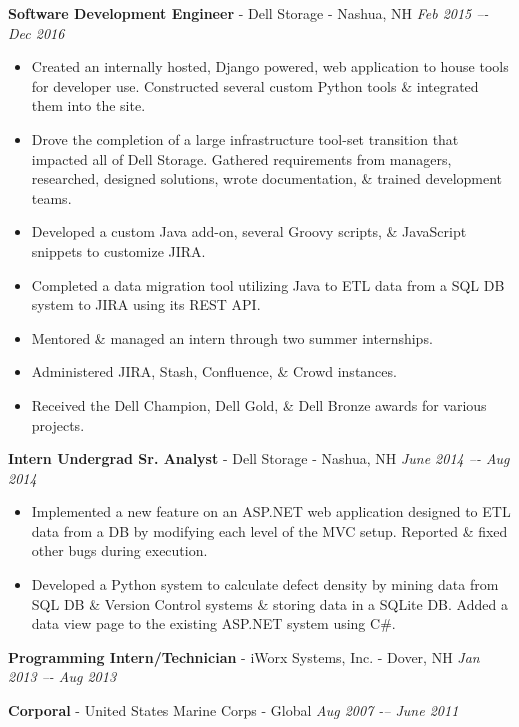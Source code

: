 \documentclass[letterpaper,10pt]{article}
\begin{document}
\noindent
\textbf{Software Development Engineer} - Dell Storage - Nashua, NH
\hfill
\textit{Feb 2015 –- Dec 2016}
\begin{itemize}
\setlength
  \item Created an internally hosted, Django powered, web application to house tools for developer use. Constructed several custom Python tools \& integrated them into the site.
  \item Drove the completion of a large infrastructure tool-set transition that impacted all of Dell Storage. Gathered requirements from managers, researched, designed solutions, wrote documentation, \& trained development teams.
  \item Developed a custom Java add-on, several Groovy scripts, \& JavaScript snippets to customize JIRA.
  \item Completed a data migration tool utilizing Java to ETL data from a SQL DB system to JIRA using its REST API.
  \item Mentored \& managed an intern through two summer internships.
  \item Administered JIRA, Stash, Confluence, \& Crowd instances.
  \item Received the Dell Champion, Dell Gold, \& Dell Bronze awards for various projects.
\end{itemize}
\vspace{\baselineskip}
\textbf{Intern Undergrad Sr. Analyst} - Dell Storage - Nashua, NH
\hfill
\textit{June 2014 –- Aug 2014}
\begin{itemize}
\setlength
  \item Implemented a new feature on an ASP.NET web application designed to ETL data from a DB by modifying each level of the MVC setup. Reported \& fixed other bugs during execution.
  \item Developed a Python system to calculate defect density by mining data from SQL DB \& Version Control systems \& storing data in a SQLite DB. Added a data view page to the existing ASP.NET system using C\#.
\end{itemize}
\vspace{\baselineskip}

\noindent
\textbf{Programming Intern/Technician} - iWorx Systems, Inc. - Dover, NH
\hfill
\textit{Jan 2013 –- Aug 2013}
\vspace{\baselineskip}

\noindent
\textbf{Corporal} - United States Marine Corps - Global
\hfill
\textit{Aug 2007 -– June 2011}
\vspace{\baselineskip}
\end{document}
